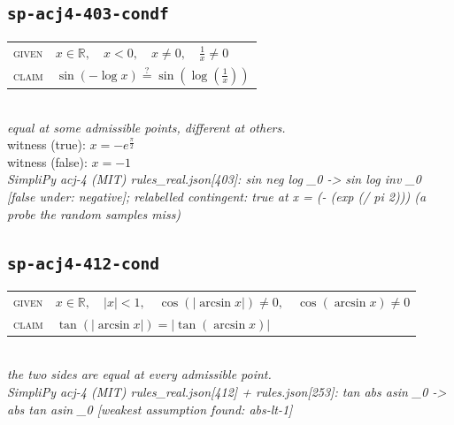 \documentclass[11pt]{article}
\begin{document}
\subsection*{\texttt{sp-acj4-403-condf}}
\begin{tabular}{@{}l@{\quad}l@{}}
\textsc{given} & $x \in \mathbb{R},\quad x < 0,\quad x \neq 0,\quad \frac{1}{x} \neq 0$ \\[4pt]
\textsc{claim} & $\displaystyle \sin\left(-\log x\right) \overset{?}{=} \sin\left(\log\left(\frac{1}{x}\right)\right)$ \\
\end{tabular}\\[2pt]
{\small\emph{equal at some admissible points, different at others.}}\\
{\footnotesize\color{gray}witness (true): $x = -e^{\frac{\pi}{2}}$}\\
{\footnotesize\color{gray}witness (false): $x = -1$}\\
\emph{SimpliPy acj-4 (MIT) rules\_real.json[403]: sin neg log \_0  ->  sin log inv \_0  [false under: negative]; relabelled contingent: true at x = (- (exp (/ pi 2))) (a probe the random samples miss)}\\

\subsection*{\texttt{sp-acj4-412-cond}}
\begin{tabular}{@{}l@{\quad}l@{}}
\textsc{given} & $x \in \mathbb{R},\quad \left|x\right| < 1,\quad \cos\left(\left|\arcsin x\right|\right) \neq 0,\quad \cos\left(\arcsin x\right) \neq 0$ \\[4pt]
\textsc{claim} & $\displaystyle \tan\left(\left|\arcsin x\right|\right) = \left|\tan\left(\arcsin x\right)\right|$ \\
\end{tabular}\\[2pt]
{\small\emph{the two sides are equal at every admissible point.}}\\
\emph{SimpliPy acj-4 (MIT) rules\_real.json[412] + rules.json[253]: tan abs asin \_0  ->  abs tan asin \_0  [weakest assumption found: abs-lt-1]}\\
\end{document}
